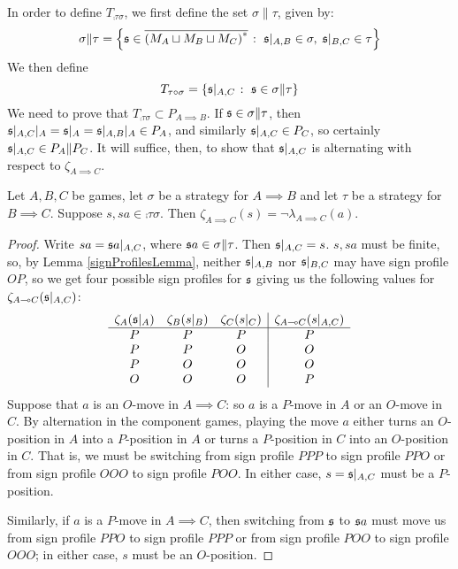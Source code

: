 \documentclass{article}
\begin{document}
In order to define $T_{\comp\tau\sigma}$, we first define the set $\sigma\|\tau$, given by:
\[
  \sigma\|\tau = \left\{\mathfrak s\in{\overline{{(M_A\sqcup M_B\sqcup M_C)}^{*}}}\;\colon\; \mathfrak s\vert_{A,B}\in\sigma,\;\mathfrak s\vert_{B,C}\in\tau\right\}
  \]
We then define
\[
  T_{\tau \circ \sigma} = \{\mathfrak s\vert_{A,C}\;\colon\; \mathfrak s\in\sigma\|\tau\}
  \]
We need to prove that $T_{\comp\tau\sigma}\subset P_{A\implies B}$.  If $\mathfrak s\in\sigma\|\tau$, then $\mathfrak s\vert_{A,C}\vert_A=\mathfrak s\vert_A=\mathfrak s\vert_{A,B}\vert_A\in P_A$, and similarly $\mathfrak s\vert_{A,C}\in P_C$, so certainly $\mathfrak s\vert_{A,C}\in P_A\|P_C$.  It will suffice, then, to show that $\mathfrak s\vert_{A,C}$ is alternating with respect to $\zeta_{A\implies C}$.  

\begin{proposition}
  Let $A,B,C$ be games, let $\sigma$ be a strategy for $A\implies B$ and let $\tau$ be a strategy for $B\implies C$.  Suppose $s,sa\in\comp\tau\sigma$.  Then $\zeta_{A\implies C}(s) = \neg\lambda_{A\implies C}(a)$.  
  \begin{proof}
    Write $sa=\mathfrak s a\vert_{A,C}$, where $\mathfrak s a\in\sigma\|\tau$.  Then $\mathfrak s\vert_{A,C}=s$.  $s,sa$ must be finite, so, by Lemma \ref{signProfilesLemma}, neither $\mathfrak s\vert_{A,B}$ nor $\mathfrak s\vert_{B,C}$ may have sign profile $OP$, so we get four possible sign profiles for $\mathfrak s$ giving us the following values for $\zeta_{A\multimap C}(\mathfrak s\vert_{A,C})$:
    \[
      \begin{array}{ccc|c}
        \zeta_A(\mathfrak s\vert_A) & \zeta_B(s\vert_B) & \zeta_C(s\vert_C) & \zeta_{A\multimap C}(s\vert_{A,C}) \\
        \hline
        P & P & P & P \\
        P & P & O & O \\
        P & O & O & O \\
        O & O & O & P
      \end{array}
      \]
    Suppose that $a$ is an $O$-move in $A\implies C$: so $a$ is a $P$-move in $A$ or an $O$-move in $C$.  By alternation in the component games, playing the move $a$ either turns an $O$-position in $A$ into a $P$-position in $A$ or turns a $P$-position in $C$ into an $O$-position in $C$.  That is, we must be switching from sign profile $PPP$ to sign profile $PPO$ or from sign profile $OOO$ to sign profile $POO$.  In either case, $s = \mathfrak s\vert_{A,C}$ must be a $P$-position.  

    Similarly, if $a$ is a $P$-move in $A\implies C$, then switching from $\mathfrak s$ to $\mathfrak s a$ must move us from sign profile $PPO$ to sign profile $PPP$ or from sign profile $POO$ to sign profile $OOO$; in either case, $s$ must be an $O$-position.
  \end{proof}
\end{proposition}
\end{document}
